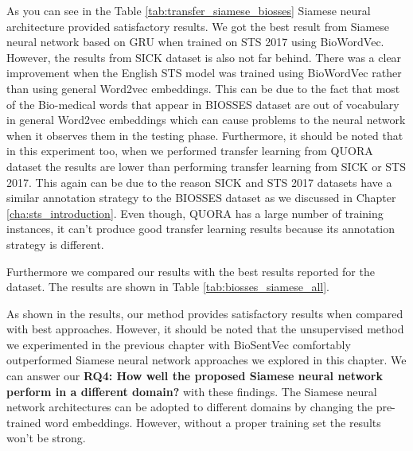 As you can see in the Table \ref{tab:transfer_siamese_biosses} Siamese neural architecture provided satisfactory results. We got the best result from Siamese neural network based on GRU when trained on STS 2017 using BioWordVec. However, the results from SICK dataset is also not far behind. There was a clear improvement when the English STS model was trained using BioWordVec rather than using general Word2vec embeddings. This can be due to the fact that most of the Bio-medical words that appear in BIOSSES dataset are out of vocabulary in general Word2vec embeddings which can cause problems to the neural network when it observes them in the testing phase. Furthermore, it should be noted that in this experiment too, when we performed transfer learning from QUORA dataset the results are lower than performing transfer learning from SICK or STS 2017. This again can be due to the reason SICK and STS 2017 datasets have a similar annotation strategy to the BIOSSES dataset as we discussed in Chapter \ref{cha:sts_introduction}. Even though, QUORA has a large number of training instances, it can't produce good transfer learning results because its annotation strategy is different. 

Furthermore we compared our results with the best results reported for the dataset. The results are shown in Table \ref{tab:biosses_siamese_all}.

\begin{table}[htb]
	\centering
	\caption[Results comparison for BIOSSES with top results]{Results for BIOSSES dataset with different variants of Siamese Neural Network compared with top results reported for BIOSSES. For each variant, Pearson Correlation ($\bm{\rho}$) is reported between the predicted values and the gold labels of the test set. }  
	\label{tab:biosses_siamese_all}
\end{table}


As shown in the results, our method provides satisfactory results when compared with best approaches. However, it should be noted that the unsupervised method we experimented in the previous chapter with BioSentVec \cite{8904728} comfortably outperformed Siamese neural network approaches we explored in this chapter. We can answer our \textbf{RQ4: How well the proposed Siamese neural network perform in a different domain?} with these findings. The Siamese neural network architectures can be adopted to different domains by changing the pre-trained word embeddings. However, without a proper training set the results won't be strong. 

